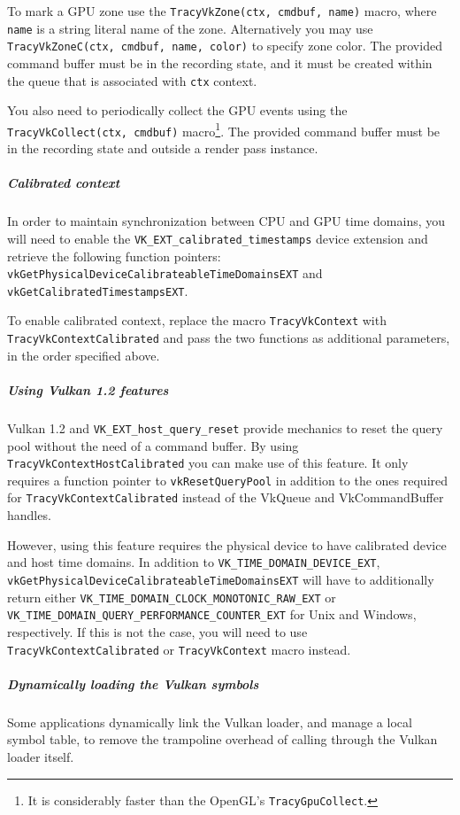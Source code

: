 \documentclass[hidelinks,titlepage,a4paper,twoside]{article}
\begin{document}
To mark a GPU zone use the \texttt{TracyVkZone(ctx, cmdbuf, name)} macro, where \texttt{name} is a string literal name of the zone. Alternatively you may use \texttt{TracyVkZoneC(ctx, cmdbuf, name, color)} to specify zone color. The provided command buffer must be in the recording state, and it must be created within the queue that is associated with \texttt{ctx} context.

You also need to periodically collect the GPU events using the \texttt{TracyVkCollect(ctx, cmdbuf)} macro\footnote{It is considerably faster than the OpenGL's \texttt{TracyGpuCollect}.}. The provided command buffer must be in the recording state and outside a render pass instance.

\subparagraph{Calibrated context}

In order to maintain synchronization between CPU and GPU time domains, you will need to enable the \texttt{VK\_EXT\_calibrated\_timestamps} device extension and retrieve the following function pointers: \texttt{vkGetPhysicalDeviceCalibrateableTimeDomainsEXT} and \texttt{vkGetCalibratedTimestampsEXT}.

To enable calibrated context, replace the macro \texttt{TracyVkContext} with \texttt{TracyVkContextCalibrated} and pass the two functions as additional parameters, in the order specified above.

\subparagraph{Using Vulkan 1.2 features}

Vulkan 1.2 and \texttt{VK\_EXT\_host\_query\_reset} provide mechanics to reset the query pool without the need of a command buffer. By using \texttt{TracyVkContextHostCalibrated} you can make use of this feature. It only requires a function pointer to \texttt{vkResetQueryPool} in addition to the ones required for \texttt{TracyVkContextCalibrated} instead of the VkQueue and VkCommandBuffer handles.

However, using this feature requires the physical device to have calibrated device and host time domains. In addition to \texttt{VK\_TIME\_DOMAIN\_DEVICE\_EXT}, \texttt{vkGetPhysicalDeviceCalibrateableTimeDomainsEXT} will have to additionally return either \texttt{VK\_TIME\_DOMAIN\_CLOCK\_MONOTONIC\_RAW\_EXT} or \texttt{VK\_TIME\_DOMAIN\_QUERY\_PERFORMANCE\_COUNTER\_EXT} for Unix and Windows, respectively. If this is not the case, you will need to use \texttt{TracyVkContextCalibrated} or \texttt{TracyVkContext} macro instead.

\subparagraph{Dynamically loading the Vulkan symbols}

Some applications dynamically link the Vulkan loader, and manage a local symbol table, to remove the trampoline overhead of calling through the Vulkan loader itself.
\end{document}
